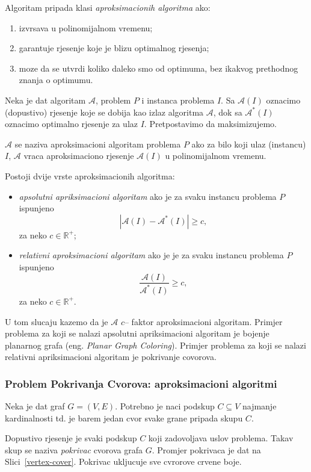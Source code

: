\documentclass[a4paper, utf8, 11pt, colorlinks]{article}
\begin{document}
  \noindent Algoritam pripada klasi \emph{aproksimacionih algoritma} ako:
  \begin{enumerate}
  	\item izvrsava u polinomijalnom vremenu;
  	\item garantuje rjesenje koje je blizu optimalnog rjesenja;
  	\item moze da se utvrdi koliko daleko smo od optimuma, bez ikakvog prethodnog znanja o optimumu.
  \end{enumerate}
  Neka je dat algoritam $\mathcal{A}$, problem $P$ i instanca problema $I$. Sa $\mathcal{A}(I)$ oznacimo (dopustivo) rjesenje koje se dobija kao izlaz algoritma $\mathcal{A}$, dok sa $\mathcal{A}^*(I)$ oznacimo optimalno rjesenje za ulaz $I$. Pretpostavimo da maksimizujemo. 
  
  $\mathcal{A}$ se naziva aproksimacioni algoritam problema $P$ ako 
  za bilo koji ulaz (instancu) $I$, $\mathcal{A}$ vraca aproksimaciono rjesenje $\mathcal{A}(I)$ u polinomijalnom vremenu. 
  
  Postoji dvije vrste aproksimacionih algoritma:
  \begin{itemize}
  	\item \emph{apsolutni apriksimacioni algoritam} ako je za svaku instancu problema $P$ ispunjeno
  	$$ |\mathcal{A}(I) - \mathcal{A}^*(I)| \geq c,$$ za neko $c\in \mathbb{R}^+$;
  	\item \emph{relativni aproksimacioni algoritam} ako je  je za svaku instancu problema $P$ ispunjeno
  	$$\frac{\mathcal{A}(I)}{\mathcal{A}^*(I)} \geq c,$$ za neko $c\in \mathbb{R}^+$.
  \end{itemize}
  
  \noindent U tom slucaju kazemo da je $\mathcal{A}$ $c$-- faktor aproksimacioni algoritam.
  Primjer problema za koji se nalazi apsolutni apriksimacioni algoritam je bojenje planarnog grafa (eng. \emph{Planar Graph Coloring}). Primjer problema za koji se nalazi relativni apriksimacioni algoritam je pokrivanje covorova. 
  
  \subsubsection{Problem Pokrivanja Cvorova: aproksimacioni algoritmi}
  
  Neka je dat graf $G=(V,E)$. Potrebno je naci podskup $C\subseteq V$ najmanje kardinalnosti td. je barem jedan cvor svake grane pripada skupu $C$. 
  
  Dopustivo rjesenje je svaki podskup $C$ koji zadovoljava uslov problema. Takav skup se naziva \emph{pokrivac} cvorova grafa $G$. Promjer pokrivaca je dat na Slici~\ref{vertex-cover}. Pokrivac ukljucuje sve cvrorove crvene boje. 
  
\end{document}
